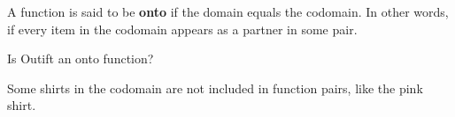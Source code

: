 \documentclass{ximera}
\begin{document}
\begin{definition}
  A function is said to be \textbf{onto} if the domain equals the codomain. In other words, if every item in the codomain appears as a partner in some pair.   
  
\end{definition}



\begin{exercise}
 Is Outift an onto function?
  \begin{multipleChoice}
  \end{multipleChoice}
  \begin{feedback}
Some shirts in the codomain are not included in function pairs, like the pink shirt.
  \end{feedback}
\end{exercise}
\end{document}
